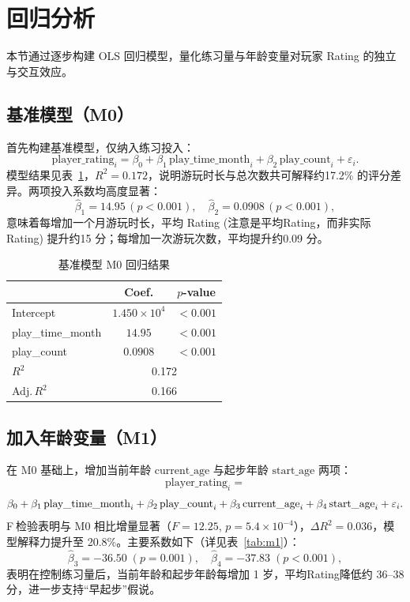 \documentclass[12pt]{article}
\begin{document}
\newpage

\section{回归分析}

本节通过逐步构建 OLS 回归模型，量化练习量与年龄变量对玩家 Rating 的独立与交互效应。

\subsection{基准模型（M0）}
首先构建基准模型，仅纳入练习投入：
\[
\text{player\_rating}_i = \beta_0 + \beta_1\,\text{play\_time\_month}_i
+ \beta_2\,\text{play\_count}_i + \varepsilon_i.
\]
模型结果见表~\ref{tab:m0}，$R^2=0.172$，说明游玩时长与总次数共可解释约17.2\% 的评分差异。两项投入系数均高度显著：
\[
\hat\beta_1=14.95\,(p<0.001),\quad
\hat\beta_2=0.0908\,(p<0.001),
\]
意味着每增加一个月游玩时长，平均 Rating (注意是平均Rating，而非实际Rating) 提升约15 分；每增加一次游玩次数，平均提升约0.09 分。

\begin{table}[htbp]
	\centering
	\caption{基准模型 M0 回归结果}\label{tab:m0}
	\begin{tabular}{lcc}
		\toprule
		& Coef.      & $p$-value  \\\midrule
		Intercept       & $1.450\times10^4$ & $<0.001$ \\
		play\_time\_month & $14.95$     & $<0.001$ \\
		play\_count       & $0.0908$    & $<0.001$ \\
		\midrule
		$R^2$           & \multicolumn{2}{c}{0.172} \\
		Adj.\,$R^2$     & \multicolumn{2}{c}{0.166} \\
		\bottomrule
	\end{tabular}
\end{table}

\subsection{加入年龄变量（M1）}
在 M0 基础上，增加当前年龄 \(\text{current\_age}\) 与起步年龄 \(\text{start\_age}\) 两项：
\[
\text{player\_rating}_i =
\]
\[
\beta_0
+ \beta_1\,\text{play\_time\_month}_i
+ \beta_2\,\text{play\_count}_i \\
+ \beta_3\,\text{current\_age}_i
+ \beta_4\,\text{start\_age}_i
+ \varepsilon_i.
\]
F 检验表明与 M0 相比增量显著（$F=12.25$, $p=5.4\times10^{-4}$），$\Delta R^2=0.036$，模型解释力提升至 20.8\%。主要系数如下（详见表~\ref{tab:m1}）：
\[
\hat\beta_3=-36.50\;(p=0.001),\quad
\hat\beta_4=-37.83\;(p<0.001),
\]
表明在控制练习量后，当前年龄和起步年龄每增加 1 岁，平均Rating降低约 36–38 分，进一步支持“早起步”假说。
\end{document}
